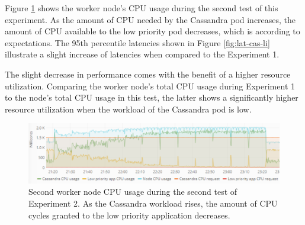 %
Figure \ref{fig:cpu-cas-lpp-li-2} shows the worker node's CPU usage during the second test of this experiment. As the amount of CPU needed by the Cassandra pod increases, the amount of CPU available to the low priority pod decreases, which is according to expectations. The 95th percentile latencies shown in Figure \ref{fig:lat-cas-li} illustrate a slight increase of latencies when compared to the Experiment 1.


The slight decrease in performance comes with the benefit of a higher resource utilization. Comparing the worker node's total CPU usage during Experiment 1 to the node's total CPU usage in this test, the latter shows a significantly higher resource utilization when the workload of the Cassandra pod is low.

\begin{figure}
\centering
\includegraphics[width=\columnwidth]{Images/Experiments/CPU/Grafana/cpu-cas-lpp-li-2.PNG}
\caption{Second worker node CPU usage during the second test of Experiment 2. As the Cassandra workload rises, the amount of CPU cycles granted to the low priority application decreases.}
\label{fig:cpu-cas-lpp-li-2}
\end{figure}

